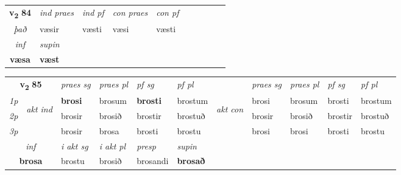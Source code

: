 \noindent
\begin{tabular}{lllllllllll} \toprule
\multicolumn{2}{c}{\textbf{v{\textsubscript{2}}} \Large{\textbf{84}}}  &  \textit{ind praes} & \textit{ind pf} & \textit{con praes} & \textit{con pf} \\*
\multicolumn{2}{c}{ \textit{það} } & væsir & væsti & væsi & væsti \\*

\cmidrule{3-3}
   \multicolumn{2}{c}{\textit{inf}}      & \textit{supin}   \\*
  \multicolumn{2}{c}{\textbf{væsa}}       &  \textbf{væst}   \\*
\end{tabular}

\noindent
\begin{tabular}{lllllllllll} \toprule
\multicolumn{2}{c}{\textbf{v{\textsubscript{2}}} \Large{\textbf{85}}}  &  \textit{praes sg}  & \textit{praes pl}  &\textit{ pf sg} & \textit{pf pl} &  &  \textit{praes sg}  & \textit{praes pl}  & \textit{pf sg} & \textit{pf pl } \\*
	\cmidrule{3-6} \cmidrule{8-11}
 {\textit{1p}} & \multirow{3}{*}{\begin{turn}{90}\textit{akt ind}\end{turn}} & \textbf{brosi} & brosum & \textbf{brosti} & brostum & \multirow{3}{*}{\begin{turn}{90}\textit{akt con}\end{turn}} &brosi & brosum & brosti & brostum\\*
 {\textit{2p}} &  &  brosir  & brosið & brostir & brostuð & & brosir & brosið & brostir & brostuð \\*
{\textit{3p}} &  & brosir & brosa & brosti & brostu & & brosi & brosi& brosti & brostu \\*
\cmidrule{3-6} \cmidrule{8-11}

   \multicolumn{2}{c}{\textit{inf}}  & \textit{i akt sg} & \textit{i akt pl}   & \textit{presp} & \textit{supin}   \\*
  \multicolumn{2}{c}{\textbf{brosa}} & brostu  & brosið   & brosandi &  \textbf{brosað}   \\*
\end{tabular}


